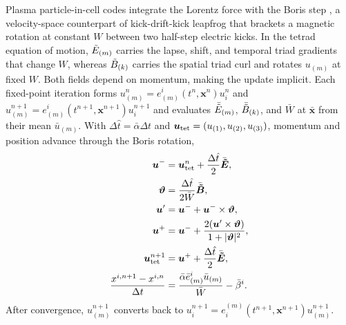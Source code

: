 Plasma particle-in-cell codes integrate the Lorentz force with the Boris step \cite{boris1970relativistic,1991ppcs.book.....B}, a velocity-space counterpart of kick-drift-kick leapfrog that brackets a magnetic rotation at constant $W$ between two half-step electric kicks. In the tetrad equation of motion, $\tilde{E}_{(m)}$ carries the lapse, shift, and temporal triad gradients that change $W$, whereas $\tilde{B}_{(k)}$ carries the spatial triad curl and rotates $u_{(m)}$ at fixed $W$. Both fields depend on momentum, making the update implicit. Each fixed-point iteration forms $u_{(m)}^n = e^i_{(m)}(t^n, \bm{x}^n) u_i^n$ and $u_{(m)}^{n+1} = e^i_{(m)}(t^{n+1}, \bm{x}^{n+1}) u_i^{n+1}$ and evaluates $\bar{\tilde{E}}_{(m)}$, $\bar{\tilde{B}}_{(k)}$, and $\bar{W}$ at $\bar{\bm{x}}$ from their mean $\bar{u}_{(m)}$. With $\Delta\hat{t} = \bar{\alpha}\Delta t$ and $\bm{u}_{\rm tet} = (u_{(1)}, u_{(2)}, u_{(3)})$, momentum and position advance through the Boris rotation,
\begin{align}\label{eq:boris_rotation}
\bm{u}^{-} &= \bm{u}_{\rm tet}^n + \frac{\Delta\hat{t}}{2}\bar{\bm{\tilde{E}}}, \nonumber\\
\bm{\vartheta} &= \frac{\Delta\hat{t}}{2\bar{W}}\bar{\bm{\tilde{B}}}, \nonumber\\
\bm{u}' &= \bm{u}^{-} + \bm{u}^{-} \times \bm{\vartheta}, \nonumber\\
\bm{u}^{+} &= \bm{u}^{-} + \frac{2(\bm{u}' \times \bm{\vartheta})}{1 + |\bm{\vartheta}|^2}, \nonumber\\
\bm{u}_{\rm tet}^{n+1} &= \bm{u}^{+} + \frac{\Delta\hat{t}}{2}\bar{\bm{\tilde{E}}}, \nonumber\\
\frac{x^{i,n+1} - x^{i,n}}{\Delta t} &= \frac{\bar{\alpha}\bar{e}^i_{(m)}\bar{u}_{(m)}}{\bar{W}} - \bar{\beta}^i.
\end{align}
After convergence, $u_{(m)}^{n+1}$ converts back to $u_i^{n+1} = e^{(m)}_i(t^{n+1}, \bm{x}^{n+1}) u_{(m)}^{n+1}$.

